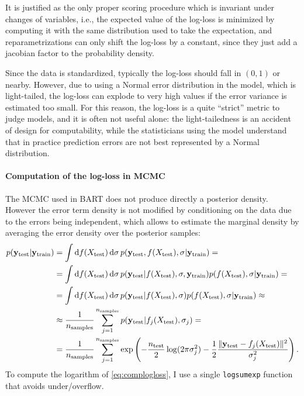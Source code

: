 \documentclass[a4paper]{article}
\theoremstyle{definition}
\begin{document}
    It is justified as the only proper scoring procedure which is invariant under changes of variables, i.e., the expected value of the log-loss is minimized by computing it with the same distribution used to take the expectation, and reparametrizations can only shift the log-loss by a constant, since they just add a jacobian factor to the probability density.

    Since the data is standardized, typically the log-loss should fall in $(0, 1)$ or nearby. However, due to using a Normal error distribution in the model, which is light-tailed, the log-loss can explode to very high values if the error variance is estimated too small. For this reason, the log-loss is a quite ``strict'' metric to judge models, and it is often not useful alone: the light-tailedness is an accident of design for computability, while the statisticians using the model understand that in practice prediction errors are not best represented by a Normal distribution.

    \paragraph{Computation of the log-loss in MCMC}

    The MCMC used in BART does not produce directly a posterior density. However the error term density is not modified by conditioning on the data due to the errors being independent, which allows to estimate the marginal density by averaging the error density over the posterior samples:
    \begin{align}
        p(\mathbf y_\text{test}|\mathbf y_\text{train})
        &= \int
            \mathrm df(X_\text{test})\, \mathrm d\sigma\,
            p(\mathbf y_\text{test}, f(X_\text{test}),\sigma|\mathbf y_\text{train}) = \notag \\
        &= \int
            \mathrm df(X_\text{test})\, \mathrm d\sigma\,
            p(\mathbf y_\text{test}| f(X_\text{test}),\sigma, \mathbf y_\text{train}) p(f(X_\text{test}),\sigma|\mathbf y_\text{train}) = \notag \\
        &= \int
            \mathrm df(X_\text{test})\, \mathrm d\sigma\,
            p(\mathbf y_\text{test}| f(X_\text{test}),\sigma) p(f(X_\text{test}),\sigma|\mathbf y_\text{train}) \approx \notag \\
        &\approx \frac 1 {n_\text{samples}} \sum_{j=1}^{n_\text{samples}}
            p(\mathbf y_\text{test}| f_j(X_\text{test}),\sigma_j) = \notag \\
        &= \frac 1 {n_\text{samples}} \sum_{j=1}^{n_\text{samples}}
            \exp\left(
                -\frac{n_\text{test}}2 \log(2\pi\sigma_j^2)
                -\frac12 \frac{\|\mathbf y_\text{test} - f_j(X_\text{test})\|^2}{\sigma_j^2}
            \right). \label{eq:complogloss}
    \end{align}
    To compute the logarithm of \autoref{eq:complogloss}, I use a single \texttt{logsumexp} function that avoids under/overflow.
\end{document}
